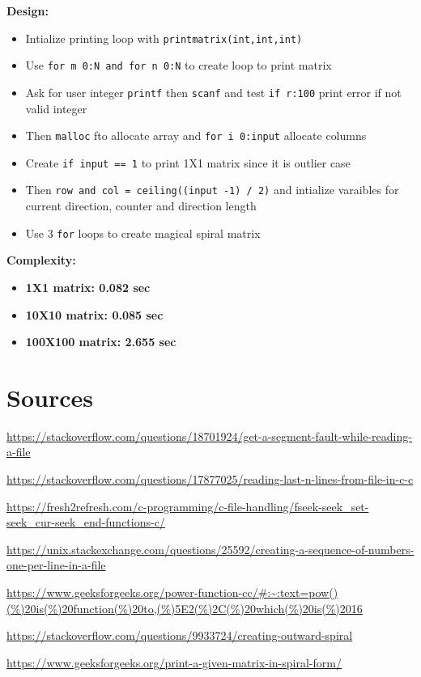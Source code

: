 \documentclass{article}
\begin{document}
\textbf{Design:}
\begin{itemize}
\item{Intialize printing loop with \texttt{printmatrix(int,int,int)}}
\item{Use \texttt{for m 0:N and for n 0:N} to create loop to print matrix}
\item{Ask for user integer \texttt{printf} then \texttt{scanf} and test \texttt{if r:100} print error if not valid integer}
\item{Then \texttt{malloc} fto allocate array and \texttt{for i 0:input} allocate columns}
\item{Create \texttt{if input == 1} to print 1X1 matrix since it is outlier case}
\item{Then \texttt{row and col = ceiling((input -1) / 2)} and intialize varaibles for current direction, counter and direction length}
\item{Use 3 \texttt{for} loops to create magical spiral matrix}
\end{itemize}

\textbf{Complexity:}
\begin{itemize}
\item{\textbf{1X1 matrix: 0.082 sec}}
\item{\textbf{10X10 matrix: 0.085 sec}}
\item{\textbf{100X100 matrix: 2.655 sec}}
  
\end{itemize}


\newpage

\section{Sources}

\url{https://stackoverflow.com/questions/18701924/get-a-segment-fault-while-reading-a-file}

\url{https://stackoverflow.com/questions/17877025/reading-last-n-lines-from-file-in-c-c}

\url{https://fresh2refresh.com/c-programming/c-file-handling/fseek-seek_set-seek_cur-seek_end-functions-c/}

\url{https://unix.stackexchange.com/questions/25592/creating-a-sequence-of-numbers-one-per-line-in-a-file}

\url{https://www.geeksforgeeks.org/power-function-cc/#:~:text=pow()(\%)20is(\%)20function(\%)20to,(\%)5E2(\%)2C(\%)20which(\%)20is(\%)2016}

\url{https://stackoverflow.com/questions/9933724/creating-outward-spiral}

\url{https://www.geeksforgeeks.org/print-a-given-matrix-in-spiral-form/}
\end{document}
